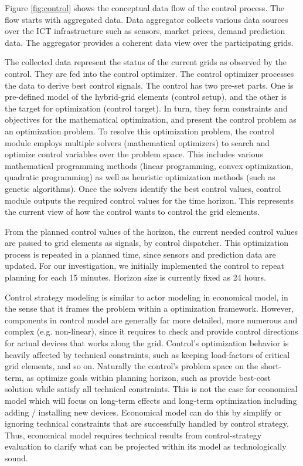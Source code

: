 \documentclass[conference]{IEEEtran}
\begin{document}
Figure \ref{fig:control} shows the conceptual data flow of the control
process. The flow starts with aggregated data. Data aggregator
collects various data sources over the ICT infrastructure such as
sensors, market prices, demand prediction data. The aggregator
provides a coherent data view over the participating grids. 

The collected data represent the status of the current grids as
observed by the control. They are fed into the control optimizer. The
control optimizer processes the data to derive best control
signals. The control has two pre-set parts. One is pre-defined model
of the hybrid-grid elements (control setup), and the other is the
target for optimization (control target). In turn, they form
constraints and objectives for the mathematical optimization, and
present the control problem as an optimization problem. To resolve
this optimization problem, the control module employs multiple solvers
(mathematical optimizers) to search and optimize control variables
over the problem space. This includes various mathematical programming
methods (linear programming, convex optimization, quadratic
programming) as well as heuristic optimization methods (such as
genetic algorithms). Once the solvers identify the best control
values, control module outputs the required control values for the
time horizon. This represents the current view of how the control
wants to control the grid elements. 

From the planned control values of the horizon, the current needed
control values are passed to grid elements as signals, by control
dispatcher. This optimization process is repeated in a planned time, 
since sensors and prediction data are updated. For our investigation,
we initially implemented the control to repeat planning for each 15
minutes. Horizon size is currently fixed as 24 hours. 

Control strategy modeling is similar to actor modeling in economical
model, in the sense that it frames the problem within a optimization
framework. However, components in control model are generally far more
detailed, more numerous and complex (e.g. non-linear), since it
requires to check and provide control directions for actual devices
that works along the grid. Control's optimization behavior is 
heavily affected by technical constraints, such as keeping
load-factors of critical grid elements, and so on. Naturally the
control's problem space on the short-term, as optimize goals within
planning horizon, such as provide best-cost solution while satisfy
all technical constraints. This is not the case for economical model
which will focus on long-term  effects and long-term optimization
including adding / installing new devices. Economical model can do
this by simplify or ignoring technical constraints that are
successfully handled by control strategy. Thus, economical model
requires technical results from control-strategy evaluation to clarify
what can be projected within its model as technologically sound. 
\end{document}
